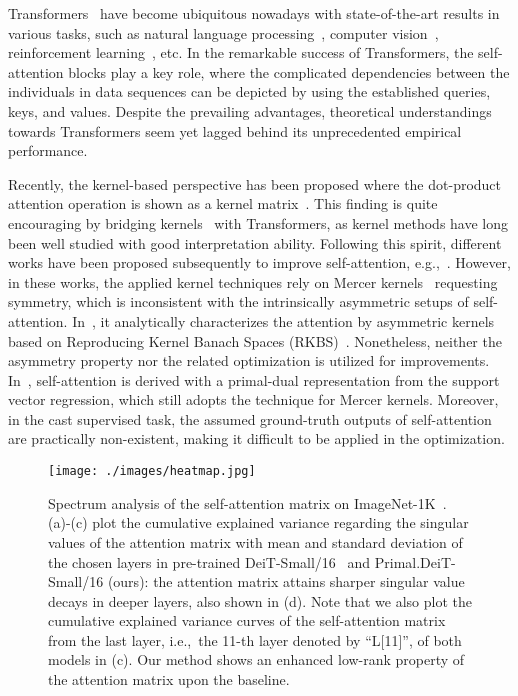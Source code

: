 \documentclass{article}
\begin{document}
	
	Transformers~\cite{vaswani2017attention} have become ubiquitous nowadays with state-of-the-art results in various tasks, such as natural language processing~\cite{kenton2019bert,brown2020language,raffel2020exploring}, computer vision~\cite{fan2021multiscale,liu2021swin,touvron2021training,chen2023jigsaw}, reinforcement learning~\cite{janner2021offline,chen2021decision,wu2022flowformer}, etc. 
	In the remarkable success of Transformers, the self-attention blocks play a key role, where the complicated dependencies between {the individuals} in data sequences can be depicted by using the established queries, keys, and values. 
	Despite the prevailing advantages, 
	theoretical understandings towards Transformers seem yet lagged behind its unprecedented empirical performance. 
	
	Recently, the kernel-based perspective has been proposed 
	{where the dot-product attention operation is shown} as a kernel matrix~\cite{tsai2019}. 
	This finding is quite encouraging by bridging kernels~\cite{vapnik1999overview} with Transformers, as kernel methods have long been well studied with good interpretation ability. 
	Following this spirit, different works have been proposed subsequently to improve self-attention, e.g.,~\cite{choromanski2021rethinking,ali2021xcit,nguyen2022improving,nguyen2022fourierformer,chi2022kerple,nguyen2023a}. 
	However, in these works, the applied kernel techniques rely on Mercer kernels~\cite{mercer1909}  requesting symmetry, which is inconsistent with the 
	{intrinsically asymmetric} setups of self-attention. 
	In~\cite{wright2021transformers}, it analytically characterizes the attention by asymmetric kernels based on Reproducing Kernel Banach Spaces (RKBS)~\cite{zhang2009reproducing}.
	{Nonetheless,} neither the asymmetry property nor the related optimization is utilized for improvements. 
	In~\cite{nguyen2023a}, self-attention is derived with a primal-dual representation from the support vector regression, which still adopts the technique for Mercer kernels.
	Moreover, in the cast supervised task, the assumed ground-truth  outputs of self-attention are practically non-existent, making it difficult to be applied in the optimization.
	
	\begin{figure}[t]
		\centering    
		{\texttt{[image: ./images/heatmap.jpg]}}
		\caption{
			Spectrum analysis
			of the self-attention matrix on ImageNet-1K~\cite{deng2009imagenet}.
			(a)-(c) plot the cumulative explained variance regarding the singular values of the attention matrix with mean and standard deviation of the chosen layers in pre-trained DeiT-Small/16~\cite{touvron2021training} and Primal.DeiT-Small/16 (ours): the attention matrix attains sharper singular value decays in deeper layers, also shown in (d).
			{Note that we also plot the cumulative explained variance curves of the self-attention matrix from the last layer, i.e.,~the 11-th layer denoted by ``L[11]'', of both models in (c).}
			Our method shows an enhanced low-rank property of the attention matrix upon the baseline.
		}
		\label{fig:overview:low-rank}
	\end{figure}
	
\end{document}
